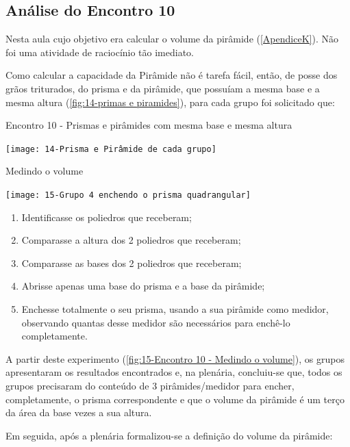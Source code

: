 \subsection{Análise do Encontro 10}

Nesta aula cujo objetivo era calcular o volume da pirâmide (\autoref{ApendiceK}). Não foi uma atividade de raciocínio tão imediato.

Como calcular a capacidade da Pirâmide não é tarefa fácil, então, de posse dos grãos triturados, do prisma e da pirâmide, que possuíam a mesma base e a mesma altura (\autoref{fig:14-primas e piramides}), para cada grupo foi solicitado que:

\begin{CenteredFigure}
    \caption{Encontro 10 - Prismas e pirâmides com mesma base e mesma altura} \label{fig:14-primas e piramides}
    \texttt{[image: 14-Prisma e Pirâmide de cada grupo]}
    \legend{\autoria}
\end{CenteredFigure}

\begin{CenteredFigure}
    \caption{Medindo o volume} \label{fig:15-Encontro 10 - Medindo o volume}
    \texttt{[image: 15-Grupo 4 enchendo o prisma quadrangular]}
    \legend{\autoria}
\end{CenteredFigure}

\begin{enumerate}
    \item Identificasse os poliedros que receberam;
    \item Comparasse a altura dos 2 poliedros que receberam;
    \item Comparasse as bases dos 2 poliedros que receberam;
    \item Abrisse apenas uma base do prisma e a base da pirâmide;
    \item Enchesse totalmente o seu prisma, usando a sua pirâmide como medidor, observando quantas desse medidor são necessários para enchê-lo completamente.
\end{enumerate}

A partir deste experimento (\autoref{fig:15-Encontro 10 - Medindo o volume}), os grupos apresentaram os resultados encontrados e, na plenária, concluiu-se que, todos os grupos precisaram do conteúdo de 3 pirâmides/medidor para encher, completamente, o prisma correspondente e que o volume da pirâmide é um terço da área da base vezes a sua altura.

Em seguida, após a plenária formalizou-se a definição do volume da pirâmide:

